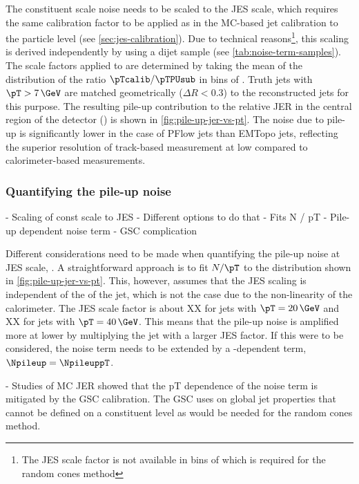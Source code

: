 
The constituent scale noise needs to be scaled to the JES scale, which requires the same calibration factor to be applied as in the MC-based jet calibration to the particle level (see \cref{sec:jes-calibration}).
Due to technical reasons\footnote{The JES scale factor is not available in bins of \pTtruth which is required for the random cones method}, this scaling is derived independently by using a dijet sample (see \cref{tab:noise-term-samples}). The scale factors applied to \Npileupconstscale are determined by taking the mean of the distribution of the ratio $\pTcalib / \pTPUsub$ in bins of \pTtruth. Truth jets with $\pT > 7\,\GeV$ are matched geometrically ($\Delta R < 0.3$) to the reconstructed jets for this purpose.
The resulting pile-up contribution to the relative JER in the central region of the detector () is shown in \cref{fig:pile-up-jer-vs-pt}.
The noise due to pile-up is significantly lower in the case of PFlow jets than EMTopo jets, reflecting the superior resolution of track-based measurement at low \pT compared to calorimeter-based measurements.


\subsubsection{Quantifying the pile-up noise}
- Scaling of const scale to JES
- Different options to do that
- Fits N / pT 
- Pile-up dependent noise term 
- GSC complication

Different considerations need to be made when quantifying the pile-up noise at JES scale, \Npileup. A straightforward approach is to fit $N/\pT$ to the distribution shown in \cref{fig:pile-up-jer-vs-pt}. This, however, assumes that the JES scaling is independent of the \pT of the jet, which is not the case due to the non-linearity of the calorimeter. The JES scale factor is about XX for jets with $\pT = 20\,\GeV$ and XX for jets with $\pT = 40\,\GeV$.
This means that the pile-up noise is amplified more at lower \pT by multiplying the jet \pT with a larger JES factor. If this were to be considered, the noise term needs to be extended by a \pT-dependent term, $\Npileup = \NpileuppT$.

- Studies of MC JER showed that the pT dependence of the noise term is mitigated by the GSC calibration. The GSC uses on global jet properties that cannot be defined on a constituent level as would be needed for the random cones method. 


